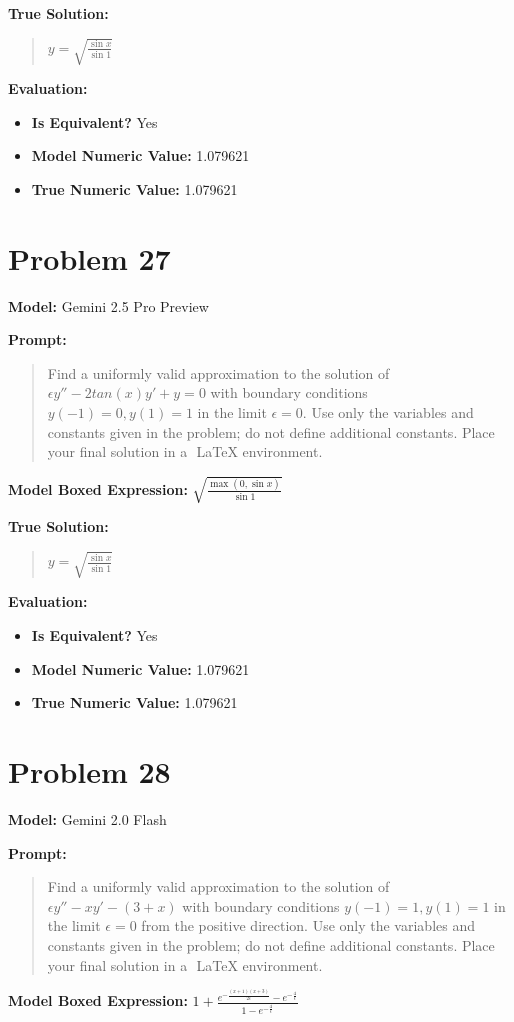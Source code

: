 \documentclass{article}
\begin{document}
\textbf{True Solution:}
\begin{quote}
$y = \sqrt{\frac{\sin x}{\sin 1}}$
\end{quote}

\textbf{Evaluation:}
\begin{itemize}
\item \textbf{Is Equivalent?} Yes
\item \textbf{Model Numeric Value:} 1.079621
\item \textbf{True Numeric Value:} 1.079621
\end{itemize}
\vspace{1cm}
\section*{Problem 27}
\textbf{Model:} Gemini 2.5 Pro Preview

\textbf{Prompt:}
\begin{quote}
Find a uniformly valid approximation to the solution of $\epsilon y''-2 tan(x) y'+y=0$ with boundary conditions $y(-1)=0, y(1)=1$ in the limit $\epsilon = 0$. Use only the variables and constants given in the problem; do not define additional constants. Place your final solution in a $\boxed{}$ LaTeX environment.
\end{quote}
\textbf{Model Boxed Expression:} $\sqrt{\frac{\max(0, \sin x)}{\sin 1}}$

\textbf{True Solution:}
\begin{quote}
$y = \sqrt{\frac{\sin x}{\sin 1}}$
\end{quote}

\textbf{Evaluation:}
\begin{itemize}
\item \textbf{Is Equivalent?} Yes
\item \textbf{Model Numeric Value:} 1.079621
\item \textbf{True Numeric Value:} 1.079621
\end{itemize}
\vspace{1cm}
\section*{Problem 28}
\textbf{Model:} Gemini 2.0 Flash

\textbf{Prompt:}
\begin{quote}
Find a uniformly valid approximation to the solution of $\epsilon y''-x y'-(3+x)$ with boundary conditions $y(-1)=1, y(1)=1$ in the limit $\epsilon = 0$ from the positive direction. Use only the variables and constants given in the problem; do not define additional constants. Place your final solution in a $\boxed{}$ LaTeX environment.
\end{quote}
\textbf{Model Boxed Expression:} $1 + \frac{e^{-\frac{(x+1)(x+3)}{2\epsilon}} - e^{-\frac{4}{\epsilon}}}{1-e^{-\frac{4}{\epsilon}}}$
\end{document}
